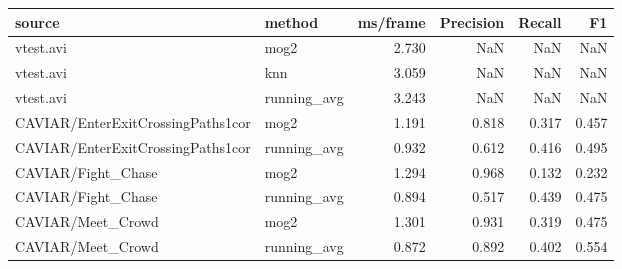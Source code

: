 \begin{tabular}{llrrrr}
\toprule
source & method & ms/frame & Precision & Recall & F1 \\
\midrule
vtest.avi & mog2 & 2.730 & NaN & NaN & NaN \\
vtest.avi & knn & 3.059 & NaN & NaN & NaN \\
vtest.avi & running_avg & 3.243 & NaN & NaN & NaN \\
CAVIAR/EnterExitCrossingPaths1cor & mog2 & 1.191 & 0.818 & 0.317 & 0.457 \\
CAVIAR/EnterExitCrossingPaths1cor & running_avg & 0.932 & 0.612 & 0.416 & 0.495 \\
CAVIAR/Fight_Chase & mog2 & 1.294 & 0.968 & 0.132 & 0.232 \\
CAVIAR/Fight_Chase & running_avg & 0.894 & 0.517 & 0.439 & 0.475 \\
CAVIAR/Meet_Crowd & mog2 & 1.301 & 0.931 & 0.319 & 0.475 \\
CAVIAR/Meet_Crowd & running_avg & 0.872 & 0.892 & 0.402 & 0.554 \\
\bottomrule
\end{tabular}

